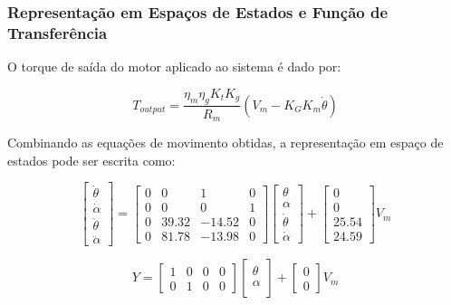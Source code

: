 \documentclass[9pt,a4paper,twocolumn,twoside]{tau-class/tau}
\begin{document}
    \subsubsection*{Representação em Espaços de Estados e Função de Transferência}
    O torque de saída do motor aplicado ao sistema é dado por:

    \begin{equation}
    T_{output} = \frac{\eta_m \eta_g K_t K_g}{R_m} \left( V_m - K_G K_m \dot{\theta} \right) 
    \label{eq:torque}
    \end{equation}

    Combinando as equações de movimento obtidas, a representação em espaço de estados pode ser escrita como:

    \begin{equation}
\begin{bmatrix}
\dot{\theta} \\
\dot{\alpha} \\
\ddot{\theta} \\
\ddot{\alpha}
\end{bmatrix}
=
\begin{bmatrix}
0 & 0 & 1 & 0 \\
0 & 0 & 0 & 1 \\
0 & 39.32 & -14.52 & 0 \\
0 & 81.78 & -13.98 & 0
\end{bmatrix}
\begin{bmatrix}
\theta \\ \alpha \\ \dot{\theta} \\ \dot{\alpha}
\end{bmatrix}
+
\begin{bmatrix}
0 \\ 0 \\ 25.54 \\ 24.59
\end{bmatrix} V_m
\label{eq:estadoNum}
\end{equation}

\begin{equation}
Y =
\begin{bmatrix}
1 & 0 & 0 & 0 \\
0 & 1 & 0 & 0
\end{bmatrix}
\begin{bmatrix}
\theta \\ \alpha \\ 
\end{bmatrix}
+
\begin{bmatrix}
0 \\ 0
\end{bmatrix} V_m
\end{equation}
\end{document}
